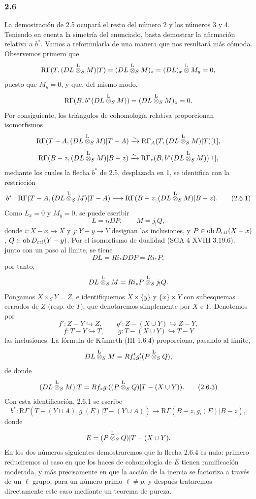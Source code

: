 \subsubsection*{2.6}
La demostración de 2.5 ocupará el resto del número 2 y los números 3 y 4. Teniendo en cuenta la simetría del enunciado, basta demostrar la afirmación relativa a $b^*$. Vamos a reformularla de una manera que nos resultará más cómoda. Observemos primero que
\[
\mathrm R\Gamma(T,(DL\overset{\mathrm L}{\otimes}_SM)|T)
 =(DL\overset{\mathrm L}{\otimes}_SM)_z
 =(DL)_x\overset{\mathrm L}{\otimes} M_y=0,
\]
puesto que $M_y=0$, y que, del mismo modo,
\[
\mathrm R\Gamma(B,b^*(DL\overset{\mathrm L}{\otimes}_SM))
 =(DL\overset{\mathrm L}{\otimes}_SM)_z=0.
\]
Por consiguiente, los triángulos de cohomología relativa proporcionan isomorfismos
\[
\mathrm R\Gamma(T-A,(DL\overset{\mathrm L}{\otimes}_SM)|T-A)
 \xrightarrow{\sim}
\mathrm R\Gamma_A(T,(DL\overset{\mathrm L}{\otimes}_SM)|T)[1],
\]
\[
\mathrm R\Gamma(B-z,(DL\overset{\mathrm L}{\otimes}_SM)|B-z)
 \xrightarrow{\sim}
\mathrm R\Gamma_z(B,b^*(DL\overset{\mathrm L}{\otimes}_SM))[1],
\]
mediante los cuales la flecha $b^*$ de 2.5, desplazada en 1, se identifica con la restricción
\begin{equation}
b^*:\mathrm R\Gamma(T-A,(DL\overset{\mathrm L}{\otimes}_SM)|T-A)
 \longrightarrow \mathrm R\Gamma(B-z,(DL\overset{\mathrm L}{\otimes}_SM)|B-z).
\tag{2.6.1}
\end{equation}
Como $L_x=0$ y $M_y=0$, se puede escribir
\begin{equation}
L=i_!DP,\qquad M=j_!Q,
\tag{2.6.2}
\end{equation}
donde $i:X-x\to X$ y $j:Y-y\to Y$ designan las inclusiones, y $P\in\operatorname{ob} D_{\mathrm{ctf}}(X-x)$, $Q\in\operatorname{ob} D_{\mathrm{ctf}}(Y-y)$. Por el isomorfismo de dualidad (SGA 4 XVIII 3.19.6), junto con un paso al límite, se tiene
\[
DL=Ri_*DDP=Ri_*P,
\]
por tanto,
\[
DL\overset{\mathrm L}{\otimes}_SM=Ri_*P\overset{\mathrm L}{\otimes}_Sj_!Q.
\]
Pongamos $X\times_SY=Z$, e identifiquemos $X\times\{y\}$ y $\{x\}\times Y$ con subesquemas cerrados de $Z$ (resp. de $T$), que denotaremos simplemente por $X$ e $Y$. Denotemos por
\[
f':Z-Y\hookrightarrow Z,\qquad
g':Z-(X\cup Y)\hookrightarrow Z-Y,
\]
\[
f:T-Y\hookrightarrow T,\qquad
g:T-(X\cup Y)\hookrightarrow T-Y
\]
las inclusiones. La fórmula de Künneth (III 1.6.4) proporciona, pasando al límite,
\[
DL\overset{\mathrm L}{\otimes}_SM=Rf'_*g'_!(P\overset{\mathrm L}{\otimes}_SQ),
\]
de donde
\begin{equation}
(DL\overset{\mathrm L}{\otimes}_SM)|T=Rf_*g_!((P\overset{\mathrm L}{\otimes}_SQ)|T-(X\cup Y)).
\tag{2.6.3}
\end{equation}
Con esta identificación, 2.6.1 se escribe
\begin{equation}
b^*:\mathrm R\Gamma(T-(Y\cup A),g_!(E)|T-(Y\cup A))
 \longrightarrow \mathrm R\Gamma(B-z,g_!(E)|B-z),
\tag{2.6.4}
\end{equation}
donde
\[
E=(P\overset{\mathrm L}{\otimes}_SQ)|T-(X\cup Y).
\]
En los dos números siguientes demostraremos que la flecha 2.6.4 es nula: primero reduciremos al caso en que los haces de cohomología de $E$ tienen ramificación moderada, y más precisamente en que la acción de la inercia se factoriza a través de un $\ell$-grupo, para un número primo $\ell\ne p$, y después trataremos directamente este caso mediante un teorema de pureza.

